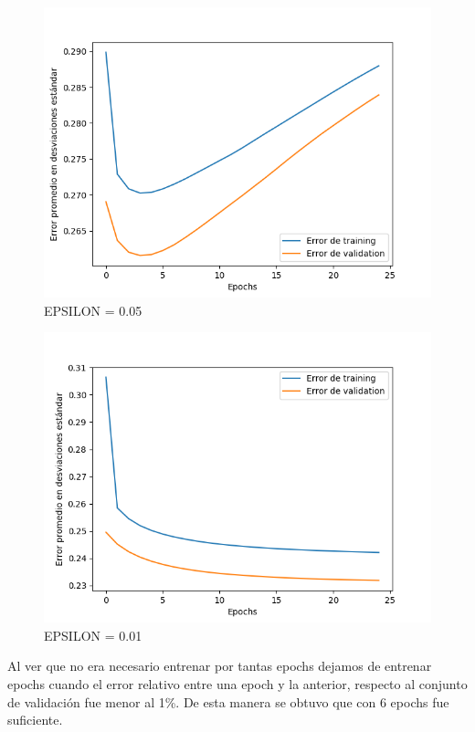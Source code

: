 \documentclass[
]{article}
\begin{document}
\begin{figure}
\centering
\includegraphics{mlp_imgs/error_eps005.png}
\caption{EPSILON = 0.05}
\end{figure}

\begin{figure}
\centering
\includegraphics{mlp_imgs/error_eps001.png}
\caption{EPSILON = 0.01}
\end{figure}

Al ver que no era necesario entrenar por tantas epochs dejamos de
entrenar epochs cuando el error relativo entre una epoch y la anterior,
respecto al conjunto de validación fue menor al 1\%. De esta manera se
obtuvo que con 6 epochs fue suficiente.
\end{document}
